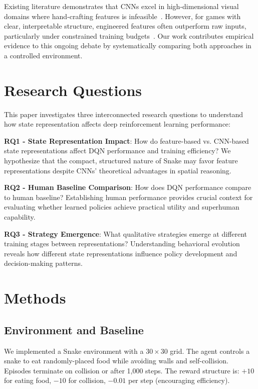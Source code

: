 \documentclass[10pt,a4paper,twocolumn]{article}
\begin{document}
Existing literature demonstrates that CNNs excel in high-dimensional visual domains where hand-crafting features is infeasible~\cite{mnih2015human,krizhevsky2012imagenet}. However, for games with clear, interpretable structure, engineered features often outperform raw inputs, particularly under constrained training budgets~\cite{botvinick2020deep}. Our work contributes empirical evidence to this ongoing debate by systematically comparing both approaches in a controlled environment.

\section{Research Questions}

This paper investigates three interconnected research questions to understand how state representation affects deep reinforcement learning performance:

\textbf{RQ1 - State Representation Impact}: How do feature-based vs. CNN-based state representations affect DQN performance and training efficiency? We hypothesize that the compact, structured nature of Snake may favor feature representations despite CNNs' theoretical advantages in spatial reasoning.

\textbf{RQ2 - Human Baseline Comparison}: How does DQN performance compare to human baseline? Establishing human performance provides crucial context for evaluating whether learned policies achieve practical utility and superhuman capability.

\textbf{RQ3 - Strategy Emergence}: What qualitative strategies emerge at different training stages between representations? Understanding behavioral evolution reveals how different state representations influence policy development and decision-making patterns.

\section{Methods}

\subsection{Environment and Baseline}

We implemented a Snake environment with a $30 \times 30$ grid. The agent controls a snake to eat randomly-placed food while avoiding walls and self-collision. Episodes terminate on collision or after 1,000 steps. The reward structure is: $+10$ for eating food, $-10$ for collision, $-0.01$ per step (encouraging efficiency).
\end{document}
